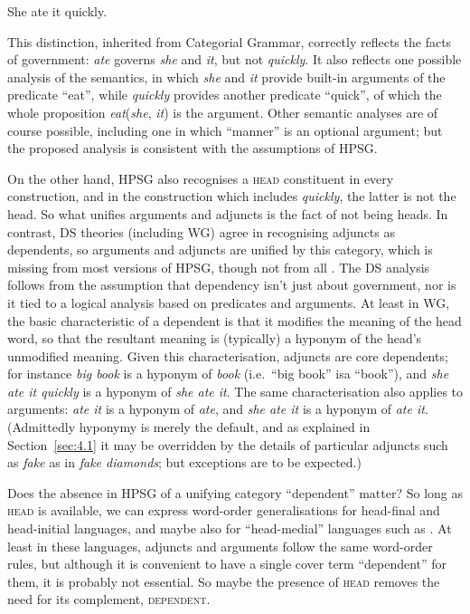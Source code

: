 \documentclass[output=paper
 	        ,biblatex
                ,babelshorthands
                ,newtxmath
                ,draftmode
                ,colorlinks, citecolor=brown
]{langscibook}
\begin{document}
\begin{exe}
	\ex \label{ex:33} She ate it quickly.
\end{exe}

This distinction, inherited from Categorial Grammar, correctly reflects the facts of government: \emph{ate} governs \emph{she} and \emph{it}, but not \emph{quickly}. It also reflects one possible analysis of the semantics, in which \emph{she} and \emph{it} provide built-in arguments of the predicate ``eat'', while \emph{quickly} provides another predicate ``quick'', of which the whole proposition \emph{eat}(\emph{she}, \emph{it}) is the argument. Other semantic analyses are of course possible, including one in which ``manner'' is an optional argument; but the proposed analysis is consistent with the assumptions of HPSG.

On the other hand, HPSG also recognises a \textsc{head} constituent in every construction, and in the construction which includes \emph{quickly}, the latter is not the head. So what unifies arguments and adjuncts is the fact of not being heads. In contrast, DS theories (including WG) agree in recognising adjuncts as dependents, so arguments and adjuncts are unified by this category, which is missing from most versions of HPSG, though not from all \citep{BMS2001a}. The DS analysis follows from the assumption that dependency isn’t just about government, nor is it tied to a logical analysis based on predicates and arguments. At least in WG, the basic characteristic of a dependent is that it modifies the meaning of the head word, so that the resultant meaning is (typically) a hyponym of the head’s unmodified meaning. Given this characterisation, adjuncts are core dependents; for instance \emph{big book} is a hyponym of \emph{book} (i.e.\ ``big book'' isa ``book''), and \emph{she ate it quickly} is a hyponym of \emph{she ate it}. The same characterisation also applies to arguments: \emph{ate it} is a hyponym of \emph{ate}, and \emph{she ate it} is a hyponym of \emph{ate it}. (Admittedly hyponymy is merely the default, and as explained in Section~\ref{sec:4.1} it may be overridden by the details of particular adjuncts such as \emph{fake} as in \emph{fake diamonds}; but exceptions are to be expected.)

Does the absence in HPSG of a unifying category ``dependent'' matter? So long as \textsc{head} is available, we can express word-order generalisations for head-final and head-initial languages, and maybe also for ``head-medial'' languages such as  \citep[172]{Hudson2010b-u}. At least in these languages, adjuncts and arguments follow the same word-order rules, but although it is convenient to have a single cover term ``dependent'' for them, it is probably not essential. So maybe the presence of \textsc{head} removes the need for its complement, \textsc{dependent}.
\end{document}
